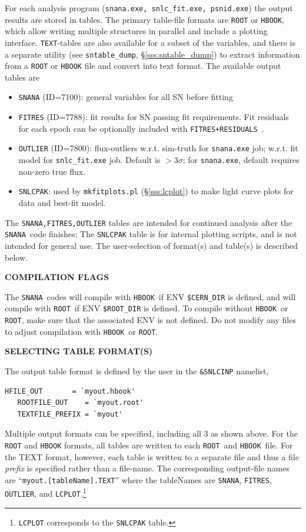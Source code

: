 \documentclass[12pt]{article}
\newcommand{\ROOT}{{\tt ROOT}}
\newcommand{\HBOOK}{{\tt HBOOK}}
\newcommand{\snana}{{\tt SNANA}}
\begin{document}
{For each analysis program
({\tt snana.exe, snlc\_fit.exe, psnid.exe})
the output results are stored in tables.
The primary table-file formats are {\ROOT} or {\HBOOK},
which allow writing multiple structures in parallel
and include a plotting interface. {\tt TEXT}-tables are 
also available for a subset of the variables, and there is a 
separate utility (see {\tt sntable\_dump}, \S\ref{sss:sntable_dump})
to extract information from a {\ROOT} or {\HBOOK} file 
and convert into text format.
The available output tables are
\begin{itemize}
  \item {\tt SNANA} (ID=7100): general variables for all SN before fitting
  \item {\tt FITRES} (ID=7788): fit results for SN passing fit requirements.
      Fit residuals for each epoch can be optionally included with
      {\tt FITRES+RESIDUALS}~.
  \item {\tt OUTLIER} (ID=7800): 
      flux-outliers w.r.t. sim-truth for {\tt snana.exe} job;
      w.r.t. fit model for {\tt snlc\_fit.exe} job.
      Default is $>3\sigma$; for {\tt snana.exe}, 
      default requires non-zero true flux.
  \item {\tt SNLCPAK}: used by {\tt mkfitplots.pl} (\S\ref{sss:lcplot})
         to make light curve plots for data and best-fit model.
\end{itemize}
%
The {\tt SNANA,FITRES,OUTLIER} tables are intended for continued 
analysis after the \snana\ code finishes; 
The {\tt SNLCPAK} table is for internal plotting scripts, and is not
intended for general use.
The user-selection of format(s) and table(s) is described below.

\bigskip\centerline{\bf\large COMPILATION FLAGS}
\medskip
The \snana\ codes will compile with \HBOOK\ if 
ENV {\tt\$CERN\_DIR} is defined, and will compile with \ROOT\
if ENV {\tt\$ROOT\_DIR} is defined. To compile without
\HBOOK\ or \ROOT, make sure that the associated ENV is 
not defined. Do not modify any files to adjust compilation
with \HBOOK\ or \ROOT.


\bigskip\centerline{\bf\large SELECTING TABLE FORMAT(S) }
\medskip

The output table format is defined by the user in the
{\tt \&SNLCINP} namelist,
\begin{Verbatim}[frame=single]
   HFILE_OUT       = `myout.hbook'
   ROOTFILE_OUT    = `myout.root'
   TEXTFILE_PREFIX = `myout'
\end{Verbatim}
%
Multiple output formats can be specified, including all 3 as 
shown above. For the {\ROOT} and {\HBOOK} formats, 
all tables are written to each \ROOT\ and \HBOOK\ file.
For the TEXT format, however, each table is written
to a separate file and thus a file {\em prefix} is specified
rather than a file-name. The corresponding output-file names 
are ``{\tt myout.[tableName].TEXT}'' where the tableNames are
{\tt SNANA}, {\tt FITRES}, {\tt OUTLIER}, and 
{\tt LCPLOT}.\footnote{{\tt LCPLOT} corresponds to the {\tt SNLCPAK} table.}


}
\end{document}
